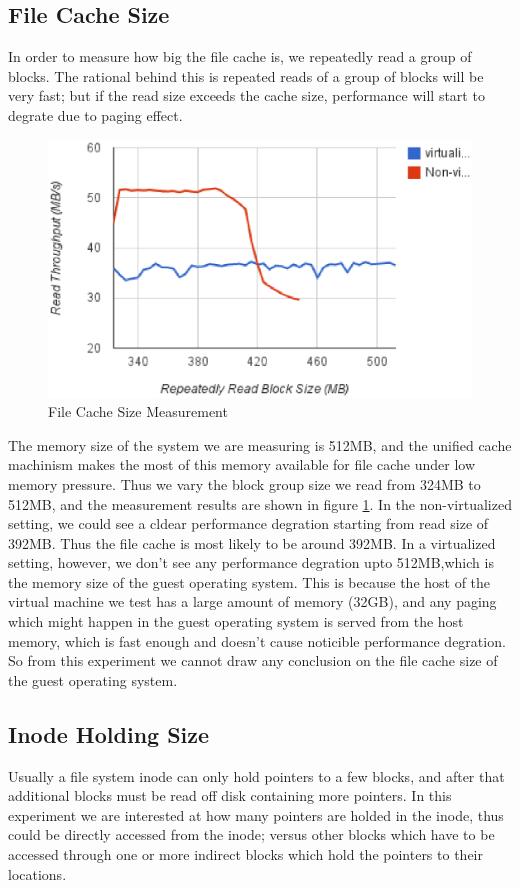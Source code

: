 \subsection{File Cache Size}
In order to measure how big the file cache is, we repeatedly read a group of blocks. The rational behind this is repeated reads of a group of blocks will be very fast; but if the read size exceeds the cache size, performance will start to degrate due to paging effect.

\begin{figure}
\centering
\includegraphics[width=.65\textwidth]{figures/cache_size.eps}
\caption{File Cache Size Measurement}
\label{fig:cache_size}
\end{figure}

The memory size of the system we are measuring is 512MB, and the unified cache machinism makes the most of this memory available for file cache under low memory pressure. Thus we vary the block group size we read from 324MB to 512MB, and the measurement results are shown in figure \ref{fig:cache_size}. In the non-virtualized setting, we could see a cldear performance degration starting from read size of 392MB. Thus the file cache is most likely to be around 392MB. In a virtualized setting, however, we don't see any performance degration upto 512MB,which is the memory size of the guest operating system. This is because the host of the virtual machine we test has a large amount of memory (32GB), and any paging which might happen in the guest operating system is served from the host memory, which is fast enough and doesn't cause noticible performance degration. So from this experiment we cannot draw any conclusion on the file cache size of the guest operating system.


\subsection{Inode Holding Size}
Usually a file system inode can only hold pointers to a few blocks, and after that additional blocks must be read off disk containing more pointers. In this experiment we are interested at how many pointers are holded in the inode, thus could be directly accessed from the inode; versus other blocks which have to be accessed through one or more indirect blocks which hold the pointers to their locations.

